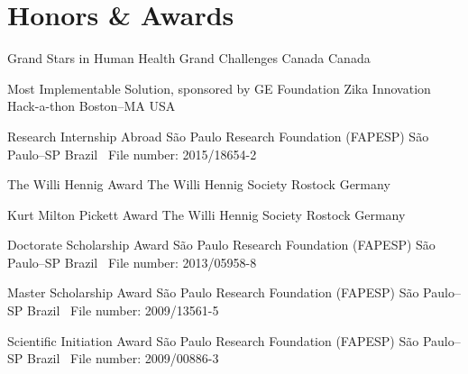 
\section{Honors \& Awards}

	{Grand Stars in Human Health}
	{Grand Challenges Canada}
	{Canada}
	{}
	{}

\cventry{---}
	{Most Implementable Solution, sponsored by GE Foundation}
	{Zika Innovation Hack-a-thon}
	{Boston--MA}
	{USA}
	{}

	{Research Internship Abroad}
	{São Paulo Research Foundation (FAPESP)}
	{São Paulo--SP}
	{Brazil}
	{
		\textbullet~File number: 2015/18654-2
	}

	{The Willi Hennig Award}
	{The Willi Hennig Society}
	{Rostock}
	{Germany}
	{}

\cventry{---}
	{Kurt Milton Pickett Award}
	{The Willi Hennig Society}
	{Rostock}
	{Germany}
	{}

	{Doctorate Scholarship Award}
	{São Paulo Research Foundation (FAPESP)}
	{São Paulo--SP}
	{Brazil}
	{
		\textbullet~File number: 2013/05958-8
	}

	{Master Scholarship Award}
	{São Paulo Research Foundation (FAPESP)}
	{São Paulo--SP}
	{Brazil}
	{
		\textbullet~File number: 2009/13561-5
	}

	{Scientific Initiation Award}
	{São Paulo Research Foundation (FAPESP)}
	{São Paulo--SP}
	{Brazil}
	{
		\textbullet~File number: 2009/00886-3
	}
